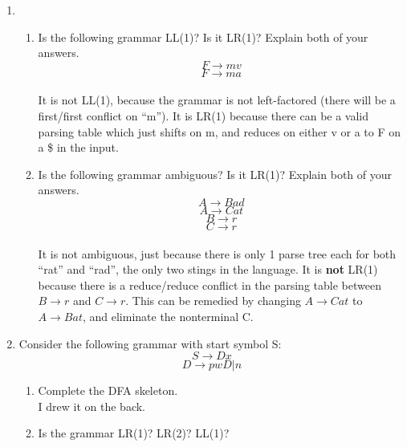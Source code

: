 
\usepackage{amsmath, verbatim, tikz, float, dsfont}

\oddsidemargin 0in
\evensidemargin 0in
\textwidth 6.5in
\topmargin -0.5in
\textheight 9.0in
\newcommand{\norm}[1]{\left\lVert #1 \right\rVert}
\newcommand{\?}{\stackrel{?}{=}}



\pagestyle{myheadings}


\begin{enumerate}
    \item
    \begin{enumerate}
        \item
        Is the following grammar LL(1)? Is it LR(1)? Explain both of your answers.
        $$F \rightarrow mv$$
        $$F \rightarrow ma$$\\

        It is not LL(1), because the grammar is not left-factored (there will be a first/first conflict on ``m''). It is LR(1) because there can be a valid parsing table which just shifts on m, and reduces on either v or a to F on a \$ in the input.

        \item
        Is the following grammar ambiguous? Is it LR(1)? Explain both of your answers.
        $$A \rightarrow Bad$$
        $$A \rightarrow Cat$$
        $$B \rightarrow r$$
        $$C \rightarrow r$$\\

        It is not ambiguous, just because there is only 1 parse tree each for both ``rat'' and ``rad'', the only two stings in the language. It is \textbf{not} LR(1) because there is a reduce/reduce conflict in the parsing table between $B \rightarrow r$ and $C \rightarrow r$. This can be remedied by changing $A \rightarrow Cat$ to $A \rightarrow Bat$, and eliminate the nonterminal C.
    \end{enumerate}

    \item Consider the following grammar with start symbol S:
    $$S \rightarrow Dx$$
    $$D \rightarrow pwD | n$$

    \begin{enumerate}
        \item Complete the DFA skeleton.\\

        I drew it on the back.\\
        \item Is the grammar LR(1)? LR(2)? LL(1)?\\


\end{enumerate}
\end{enumerate}
